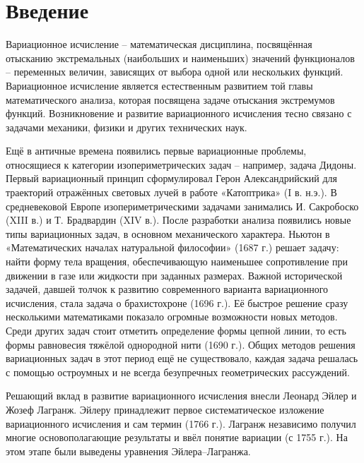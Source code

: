\section*{Введение} %

\begin{info} %
	Вариационное исчисление -- математическая дисциплина, посвящённая отысканию экстремальных (наибольших и наименьших) значений функционалов -- переменных величин, зависящих от выбора одной или нескольких функций. Вариационное исчисление является естественным развитием той главы математического анализа, которая посвящена задаче отыскания экстремумов функций. Возникновение и развитие вариационного исчисления тесно связано с задачами механики, физики и других технических наук.
\end{info}

Ещё в античные времена появились первые вариационные проблемы, относящиеся к категории изопериметрических задач -- например, задача Дидоны. Первый вариационный принцип сформулировал Герон Александрийский для траекторий отражённых световых лучей в работе «Катоптрика» (I в. н.э.). В средневековой Европе изопериметрическими задачами занимались И. Сакробоско (XIII в.) и Т. Брадвардин (XIV в.). После разработки анализа появились новые типы вариационных задач, в основном механического характера. Ньютон в «Математических началах натуральной философии» (1687 г.) решает задачу: найти форму тела вращения, обеспечивающую наименьшее сопротивление при движении в газе или жидкости при заданных размерах. Важной исторической задачей, давшей толчок к развитию современного варианта вариационного исчисления, стала задача о брахистохроне (1696 г.). Её быстрое решение сразу несколькими математиками показало огромные возможности новых методов. Среди других задач стоит отметить определение формы цепной линии, то есть формы равновесия тяжёлой однородной нити (1690 г.). Общих методов решения вариационных задач в этот период ещё не существовало, каждая задача решалась с помощью остроумных и не всегда безупречных геометрических рассуждений.

Решающий вклад в развитие вариационного исчисления внесли Леонард Эйлер и Жозеф Лагранж. Эйлеру принадлежит первое систематическое изложение вариационного исчисления и сам термин (1766 г.). Лагранж независимо получил многие основополагающие результаты и ввёл понятие вариации (с 1755 г.). На этом этапе были выведены уравнения Эйлера--Лагранжа.

